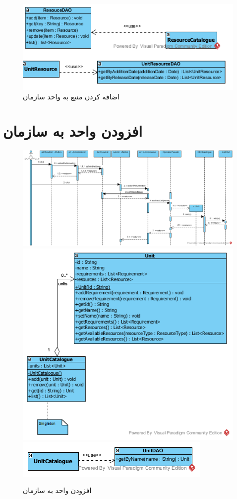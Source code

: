 \begin{landscape}
\begin{figure}[H]
	\includegraphics[scale=0.9]{img/sequence-design/AddResourceToUnitD}	
	\caption{اضافه کردن منبع به واحد سازمان}
\end{figure}
\end{landscape}

\section{افزودن واحد به سازمان}
\begin{figure}[H]
	\centering
	\includegraphics[scale=0.7]{img/sequence-design/AddUnitToOrganization}
	\includegraphics[scale=0.6]{img/sequence-design/AddUnitToOrganizationC}
	\includegraphics[scale=0.6]{img/sequence-design/AddUnitToOrganizationD}
	\caption{افزودن واحد به سازمان}
\end{figure}

